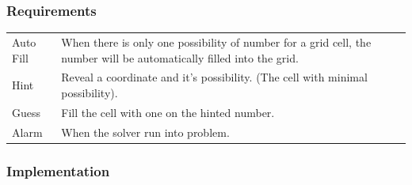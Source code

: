 \documentclass[a4paper]{article}
\begin{document}
\subsubsection{Requirements}
\begin{center}
\begin{tabular}{|p{3.5cm}|p{10cm}|}
\hline
\color{blue}{Requirements} & \color{blue}{Function}\\
\hline
Auto Fill & When there is only one possibility of number for a grid cell, the number will be automatically filled into the grid.\\
\hline
Hint & Reveal a coordinate and it's possibility. (The cell with minimal possibility).\\
\hline
Guess & Fill the cell with one on the hinted number.\\
\hline
Alarm & When the solver run into problem.\\
\hline
\end{tabular}
\end{center}

\subsubsection{Implementation}
\end{document}
